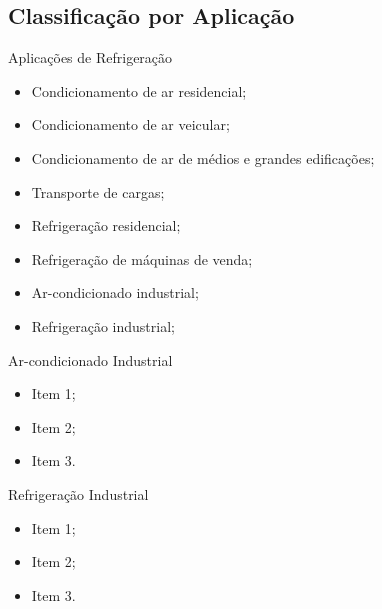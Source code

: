 \subsection{Classificação por Aplicação}

    \begin{frame}{Aplicações de Refrigeração}\vspace*{-2em}
        \begin{itemize}
            \item<1-> Condicionamento de ar residencial;
            \item<2-> Condicionamento de ar veicular;
            \item<3-> Condicionamento de ar de médios e grandes edificações;
            \item<4-> Transporte de cargas;
            \item<5-> Refrigeração residencial;
            \item<6-> Refrigeração de máquinas de venda;
            \item<7-> Ar-condicionado industrial;
            \item<8-> Refrigeração industrial;
        \end{itemize}
    \end{frame}

    \begin{frame}{Ar-condicionado Industrial}\vspace*{-2em}
        \begin{itemize}
            \item<1-> Item 1;
            \item<2-> Item 2;
            \item<3-> Item 3.
        \end{itemize}
    \end{frame}

    \begin{frame}{Refrigeração Industrial}\vspace*{-2em}
        \begin{itemize}
            \item<1-> Item 1;
            \item<2-> Item 2;
            \item<3-> Item 3.
        \end{itemize}
    \end{frame}

